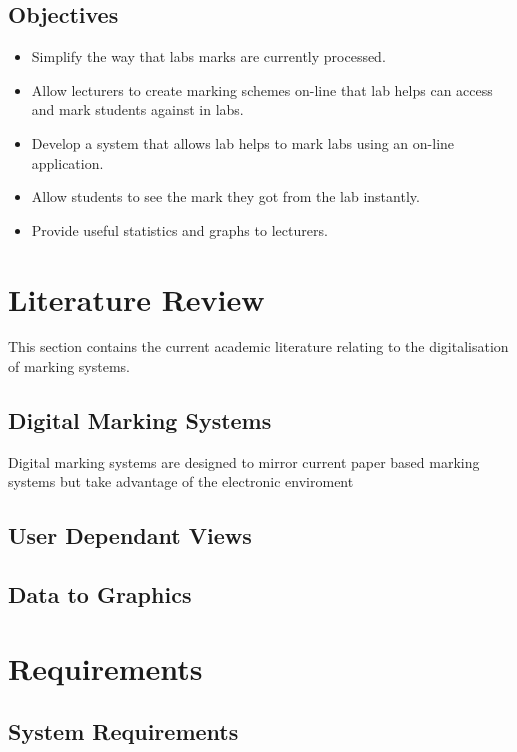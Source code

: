 \documentclass[12pt]{article}  %
\theoremstyle{definition}
\theoremstyle{remark}
\begin{document}
\subsection{Objectives}
\begin{itemize}
\item Simplify the way that labs marks are currently processed.
\item Allow lecturers to create marking schemes on-line that lab helps can access and mark students against in labs.
\item Develop a system that allows lab helps to mark labs using an on-line application.
\item Allow students to see the mark they got from the lab instantly.
\item Provide useful statistics and graphs to lecturers.
\end{itemize}






\newpage
\section{Literature Review}

This section contains the current academic literature relating to the digitalisation of marking systems. 
\subsection{Digital Marking Systems}
Digital marking systems are designed to mirror current paper based marking systems but take advantage of the electronic enviroment \cite{EssayType} 

\subsection{User Dependant Views}


\subsection{Data to Graphics}

\newpage
\section{Requirements}
\subsection{System Requirements}
\end{document}
